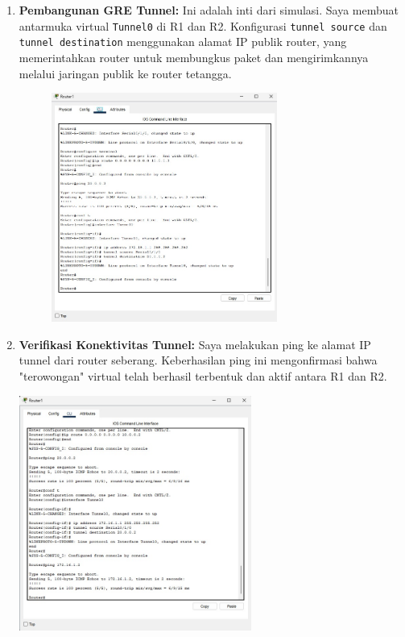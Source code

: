 \begin{enumerate}
    \item \textbf{Pembangunan GRE Tunnel:} Ini adalah inti dari simulasi. Saya membuat antarmuka virtual \texttt{Tunnel0} di R1 dan R2. Konfigurasi \texttt{tunnel source} dan \texttt{tunnel destination} menggunakan alamat IP publik router, yang memerintahkan router untuk membungkus paket dan mengirimkannya melalui jaringan publik ke router tetangga.
    \begin{figure}[H]
        \centering
        \includegraphics[width=0.7\textwidth]{img5/R1Tunnel.jpeg}
    \end{figure}
    
    \item \textbf{Verifikasi Konektivitas Tunnel:} Saya melakukan ping ke alamat IP tunnel dari router seberang. Keberhasilan ping ini mengonfirmasi bahwa "terowongan" virtual telah berhasil terbentuk dan aktif antara R1 dan R2.
    \begin{center}
        \includegraphics[width=0.6\textwidth]{img5/R1TunnelPing.jpeg}
    \end{center}


\end{enumerate}
